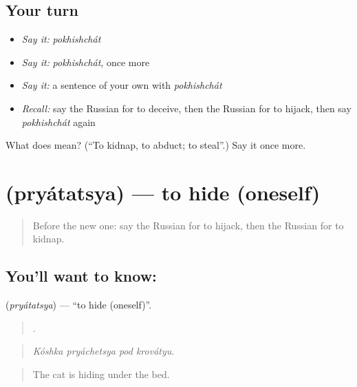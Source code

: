 \subsection*{Your turn}
\begin{itemize}
\raggedright
  \item \emph{Say it:} \emph{pokhishchát}
  \item \emph{Say it:} \emph{pokhishchát}, once more
  \item \emph{Say it:} a sentence of your own with \emph{pokhishchát}
  \item \emph{Recall:} say the Russian for to deceive, then the Russian for to hijack, then say \emph{pokhishchát} again
\end{itemize}

\begin{tcolorbox}[breakable,colback=teal!4,colframe=teal!35!black,title={Before you move on}]
What does  mean? (\textquotedblleft{}To kidnap, to abduct; to steal\textquotedblright{}.) Say it once more.
\end{tcolorbox}
\section[\texorpdfstring{\ru{прятаться} (pryátatsya)}{прятаться (pryátatsya)}]{ (pryátatsya) — to hide (oneself)}

\label{lesson:RU-C290-pryatatsya}



\begin{quote}
Before the new one: say the Russian for to hijack, then the Russian for to kidnap.
\end{quote}

\subsection*{You'll want to know: }
\textbf{} (\emph{pryátatsya}) — \textquotedblleft{}to hide (oneself)\textquotedblright{}.

\begin{quote}
   .
\end{quote}

\begin{quote}
\emph{Kóshka pryáchetsya pod krovátyu.}
\end{quote}

\begin{quote}
The cat is hiding under the bed.
\end{quote}

